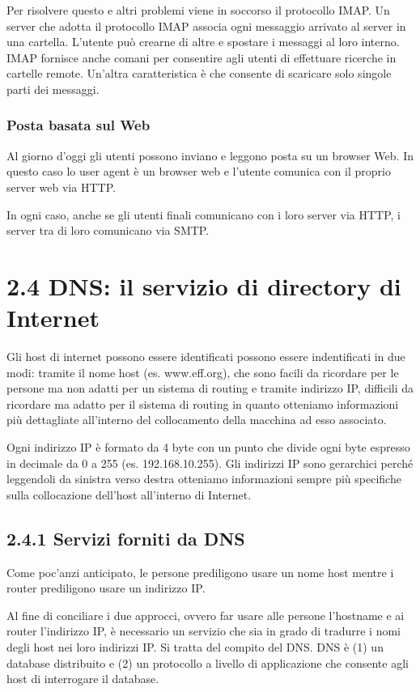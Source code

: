 \documentclass{book}
\begin{document}
Per risolvere questo e altri problemi viene in soccorso il protocollo IMAP. Un server che adotta il protocollo IMAP associa ogni messaggio arrivato al server in una cartella. L'utente può crearne di altre e spostare i messaggi al loro interno. IMAP fornisce anche comani per consentire agli utenti di effettuare ricerche in cartelle remote. Un'altra caratteristica è che consente di scaricare solo singole parti dei messaggi.

\subsubsection*{Posta basata sul Web}
Al giorno d'oggi gli utenti possono inviano e leggono posta su un browser Web. In questo caso lo user agent è un browser web e l'utente comunica con il proprio server web via HTTP.

In ogni caso, anche se gli utenti finali comunicano con i loro server via HTTP, i server tra di loro comunicano via SMTP.

\section*{2.4 DNS: il servizio di directory di Internet}
Gli host di internet possono essere identificati possono essere indentificati in due modi: tramite il nome host (es. www.eff.org), che sono facili da ricordare per le persone ma non adatti per un sistema di routing e tramite indirizzo IP, difficili da ricordare ma adatto per il sistema di routing in quanto otteniamo informazioni più dettagliate all'interno del collocamento della macchina ad esso associato.

Ogni indirizzo IP è formato da 4 byte con un punto che divide ogni byte espresso in decimale da 0 a 255 (es. 192.168.10.255). Gli indirizzi IP sono gerarchici perché leggendoli da sinistra verso destra otteniamo informazioni sempre più specifiche sulla collocazione dell'host all'interno di Internet.

\subsection*{2.4.1 Servizi forniti da DNS}
Come poc'anzi anticipato, le persone prediligono usare un nome host mentre i router prediligono usare un indirizzo IP.

Al fine di conciliare i due approcci, ovvero far usare alle persone l'hostname e ai router l'indirizzo IP, è necessario un servizio che sia in grado di tradurre i nomi degli host nei loro indirizzi IP. Si tratta del compito del DNS. DNS è (1) un database distribuito e (2) un protocollo a livello di applicazione che consente agli host di interrogare il database.
\end{document}
